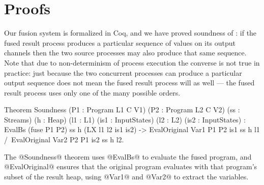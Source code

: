 
\section{Proofs}
\label{s:Proofs}

Our fusion system is formalized in Coq, and we have proved soundness of : if the fused result process produces a particular sequence of values on its output channels then the two source processes may also produce that same sequence. Note that due to non-determinism of process execution the converse is not true in practice: just because the two concurrent processes can produce a particular output sequence does not mean the fused result process will as well --- the fused result process uses only one of the many possible orders. 


\begin{code}
Theorem Soundness (P1 : Program L1 C V1) (P2 : Program L2 C V2) (ss : Streams) (h : Heap)
                  (l1 : L1) (is1 : InputStates) (l2 : L2) (is2 : InputStates) 
  :  EvalBs (fuse P1 P2) ss h (LX l1 l2 is1 is2)
  -> EvalOriginal Var1 P1 P2 is1 ss h l1 /\ EvalOriginal Var2 P2 P1 is2 ss h l2.
\end{code}

The @Soundness@ theorem uses @EvalBs@ to evaluate the fused program, and @EvalOriginal@ ensures that the original program evaluates with that program's subset of the result heap, using @Var1@ and @Var2@ to extract the variables.


